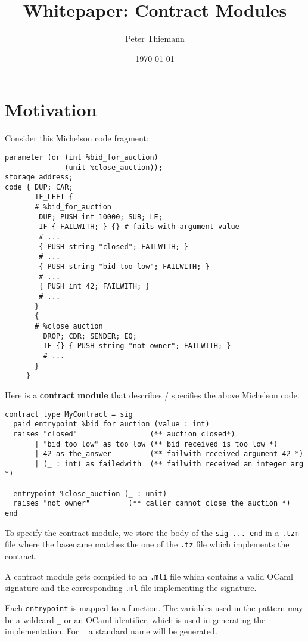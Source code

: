 \documentclass[a4paper]{llncs}
\title{Whitepaper: Contract Modules}
\author{Peter Thiemann}
\institute{}
\date{\today}
\begin{document}
\maketitle
\pagestyle{plain}

\section{Motivation}
\label{sec:motivation}


Consider this Michelson code fragment:
\begin{lstlisting}[language=michelson,caption={Michelson code example},label={lst:code-example}]
parameter (or (int %bid_for_auction)
              (unit %close_auction));
storage address;
code { DUP; CAR; 
       IF_LEFT {
       # %bid_for_auction
        DUP; PUSH int 10000; SUB; LE;
        IF { FAILWITH; } {} # fails with argument value
        # ...
        { PUSH string "closed"; FAILWITH; }
        # ...
        { PUSH string "bid too low"; FAILWITH; }
        # ...
        { PUSH int 42; FAILWITH; }
        # ...
       }
       {
       # %close_auction
         DROP; CDR; SENDER; EQ;
         IF {} { PUSH string "not owner"; FAILWITH; }
         # ...
       }
     }
\end{lstlisting}

Here is a \textbf{contract module} that describes / specifies the above Michelson code.
\begin{lstlisting}[caption={Contract module example},label={lst:contract-module-example}]
contract type MyContract = sig
  paid entrypoint %bid_for_auction (value : int) 
  raises "closed"                 (** auction closed*)
       | "bid too low" as too_low (** bid received is too low *)
       | 42 as the_answer         (** failwith received argument 42 *)
       | (_ : int) as failedwith  (** failwith received an integer arg *)

  entrypoint %close_auction (_ : unit)
  raises "not owner"         (** caller cannot close the auction *)
end
\end{lstlisting}

To specify the contract module, we store
the body of the \lstinline/sig ... end/ in a
\texttt{.tzm} file where the basename matches the one of the
\texttt{.tz} file which implements the contract.

A contract module gets compiled to an \texttt{.mli} file which contains a
valid OCaml signature and the corresponding \texttt{.ml} file
implementing the signature. 

Each \lstinline/entrypoint/ is mapped to a function. The variables
used in the pattern may be a wildcard \lstinline/_/ or an OCaml identifier, which
is used in generating the implementation. For \lstinline/_/ a standard
name will be generated.
\end{document}
